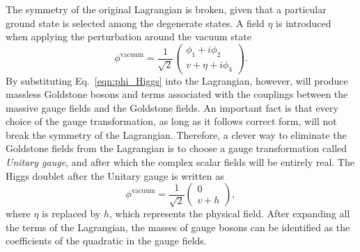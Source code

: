 The symmetry of the original Lagrangian is broken, given that a particular ground state is selected among the degenerate states.
A field $\eta$ is introduced when applying the perturbation around the vacuum state 
\begin{equation}
\label{eqn:phi_Higgs}
\phi^{\text{vacuum}}=\frac{1}{\sqrt{2}}\begin{pmatrix}
  \phi_{1}+i\phi_{2} \\
  v + \eta + i\phi_{4} 
 \end{pmatrix}
 .
\end{equation}
By substituting Eq.~\ref{eqn:phi_Higgs} into the Lagrangian, however, will produce massless Goldstone bosons and terms associated with the couplings between the massive gauge fields and the Goldstone fields. An important fact is that every choice of the gauge transformation, as long as it follows correct form, will not break the symmetry of the Lagrangian. Therefore, a clever way to eliminate the Goldstone fields from the Lagrangian is to choose a gauge transformation called \emph{Unitary gauge}, and after which the complex scalar fields will be entirely real. The Higgs doublet after the Unitary gauge is written as
\begin{equation}
\label{eqn:phi_Higgs_UniGauge}
\phi^{\text{vacuum}}=\frac{1}{\sqrt{2}}\begin{pmatrix}
  0 \\
  v + h 
 \end{pmatrix}
 ,
\end{equation}
where $\eta$ is replaced by $h$, which represents the physical field. After expanding all the terms of the Lagrangian, the masses of gauge bosons can be identified as the coefficients of the quadratic in the gauge fields.

